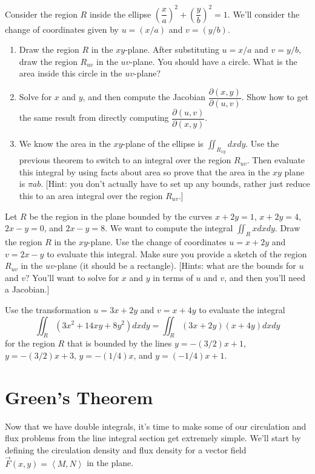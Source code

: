 \begin{problem}
 Consider the region $R$ inside the ellipse $\left(\dfrac{x}{a}\right)^2+\left(\dfrac{y}{b}\right)^2=1$.  We'll consider the change of coordinates given by $u=(x/a)$ and $v=(y/b)$.
\begin{enumerate}
 \item Draw the region $R$ in the $xy$-plane.  After substituting $u=x/a$ and $v=y/b$, draw the region $R_{uv}$ in the $uv$-plane.  You should have a circle.  What is the area inside this circle in the $uv$-plane?
 \item Solve for $x$ and $y$, and then compute the Jacobian  $\dfrac{\partial (x,y)}{\partial (u,v)}$. Show how to get the same result from directly computing $\dfrac{\partial (u,v)}{\partial (x,y)}$.
 \item We know the area in the $xy$-plane of the ellipse is $\iint_{R_{xy}} dxdy$. Use the previous theorem to switch to an integral over the region $R_{uv}$.  Then evaluate this integral by using facts about area so prove that the area in the $xy$ plane is $\pi a b$. [Hint: you don't actually have to set up any bounds, rather just reduce this to an area integral over the region $R_{uv}$.] 
\end{enumerate}

\end{problem}


\begin{problem}
Let $R$ be the region in the plane bounded by the curves $x+2y=1$, $x+2y=4$, $2x-y=0$, and $2x-y=8$.  We want to compute the integral $\iint_R xdxdy$. Draw the region $R$ in the $xy$-plane. Use the change of coordinates $u=x+2y$ and $v=2x-y$ to evaluate this integral. Make sure you provide a sketch of the region $R_{uv}$ in the $uv$-plane (it should be a rectangle).  
[Hints: what are the bounds for $u$ and $v$?  You'll want to solve for $x$ and $y$ in terms of $u$ and $v$, and then you'll need a Jacobian.]
\end{problem}


\begin{problem}
 Use the transformation $u=3x+2y$ and $v=x+4y$ to evaluate the integral $$\iint_R (3x^2+14xy+8y^2)dxdy =\iint_R (3x+2y)(x+4y)dxdy $$ for the region $R$ that is bounded by the lines $y=-(3/2)x+1$, $y=-(3/2)x+3$, $y=-(1/4)x$, and  $y=(-1/4)x+1$.
\end{problem}

\section{Green's Theorem}
Now that we have double integrals, it's time to make some of our circulation and flux problems from the line integral section get extremely simple. We'll start by defining the circulation density and flux density for a vector field $\vec F(x,y)=\left<M,N\right>$ in the plane.

